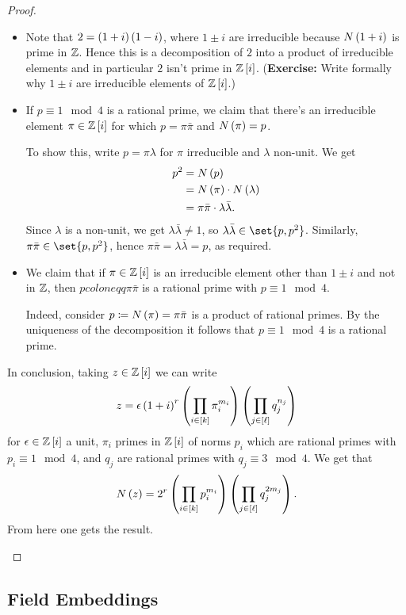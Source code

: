 \documentclass[11pt]{karticle}
\begin{document}
\begin{proof}
\begin{itemize}
\begin{itemize}
\item Note that $2 = \left( 1+i \right)\left( 1-i \right)$, where $1 \pm i$ are irreducible because $N\left( 1+i \right)$ is prime in $\mathbb{Z}$. Hence this is a decomposition of $2$ into a product of irreducible elements and in particular $2$ isn't prime in $\mathbb{Z}\left[ i \right]$. (\textbf{Exercise:} Write formally why $1 \pm i$ are irreducible elements of $\mathbb{Z}\left[ i \right]$.)

\item If $p \equiv 1 \mod{4}$ is a rational prime, we claim that there's an irreducible element $\pi \in \mathbb{Z}\left[ i \right]$ for which $p = \pi \bar{\pi}$ and $N\left( \pi \right) = p$.

To show this, write $p = \pi \lambda$ for $\pi$ irreducible and $\lambda$ non-unit. We get
\begin{align*}
p^2 &= N\left( p \right)
\\&= N\left( \pi \right) \cdot N\left( \lambda \right)
\\&= \pi \bar{\pi} \cdot \lambda \bar{\lambda} \text{.}
\end{align*}
Since $\lambda$ is a non-unit, we get $\lambda \bar{\lambda} \neq 1$, so $\lambda \bar{\lambda} \in \set{p, p^2}$. Similarly, $\pi \bar{\pi} \in \set{p, p^2}$, hence $\pi \bar{\pi} = \lambda \bar{\lambda} = p$, as required.

\item We claim that if $\pi \in \mathbb{Z}\left[ i \right]$ is an irreducible element other than $1 \pm i$ and not in $\mathbb{Z}$, then $p coloneqq \pi \bar{\pi}$ is a rational prime with $p \equiv 1 \mod{4}$.

Indeed, consider $p \coloneqq N\left( \pi \right) = \pi \bar{\pi}$ is a product of rational primes. By the uniqueness of the decomposition it follows that $p \equiv 1 \mod{4}$ is a rational prime.
\end{itemize}

In conclusion, taking $z \in \mathbb{Z}\left[ i \right]$ we can write
\[z = \eps \prs{1 + i}^r \prs{\prod_{i \in [k]} \pi_i^{m_i}} \prs{\prod_{j \in \brs{\ell}} q_j^{n_j}}\]
for $\eps \in \mbb{Z}\brs{i}$ a unit, $\pi_i$ primes in $\mathbb{Z}\left[ i \right]$ of norms $p_i$ which are rational primes with $p_i \equiv 1 \mod{4}$, and $q_j$ are rational primes with $q_j \equiv 3 \mod{4}$.
We get that
\[N\left( z \right) = 2^r \left( \prod_{i \in [k]} p_i^{m_i} \right) \left( \prod_{j \in \left[ \ell \right]} q_j^{2 m_j} \right) \text{.}\]
From here one gets the result.
\end{itemize}
\end{proof}

\subsection{Field Embeddings}
\end{document}
